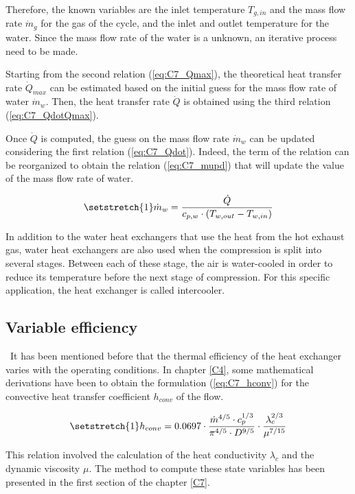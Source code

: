 Therefore, the known variables are the inlet temperature $T_{g,in}$ and the mass flow rate $\dot{m}_g$ for the gas of the cycle, and the inlet and outlet temperature for the water. Since the mass flow rate of the water is a unknown, an iterative process need to be made. 

Starting from the second relation (\ref{eq:C7_Qmax}), the theoretical heat transfer rate $\dot{Q}_{max}$ can be estimated based on the initial guess for the mass flow rate of water $\dot{m}_w$. Then, the heat transfer rate $\dot{Q}$ is obtained using the third relation (\ref{eq:C7_QdotQmax}). 

Once $\dot{Q}$ is computed, the guess on the mass flow rate $\dot{m}_w$ can be updated considering the first relation (\ref{eq:C7_Qdot}). Indeed, the term of the relation can be reorganized to obtain the relation (\ref{eq:C7_mupd}) that will update the value of the mass flow rate of water.

\begin{equation}
    \setstretch{1}
    \dot{m}_w = \frac{\dot{Q}}{c_{p,w}\cdot \left(T_{w,out} - T_{w,in}\right)} \label{eq:C7_mupd}
\end{equation}

In addition to the water heat exchangers that use the heat from the hot exhaust gas, water heat exchangers are also used when the compression is split into several stages. Between each of these stage, the air is water-cooled in order to reduce its temperature before the next stage of compression. For this specific application, the heat exchanger is called intercooler.

\subsection{Variable efficiency}
\quad\ It has been mentioned before that the thermal efficiency of the heat exchanger varies with the operating conditions. In chapter \ref{C4}, some mathematical derivations have been to obtain the formulation (\ref{eq:C7_hconv}) for the convective heat transfer coefficient $h_{conv}$ of the flow. 

\begin{equation}
    \setstretch{1}
    h_{conv} = 0.0697\cdot \frac{\dot{m}^{4/5}\cdot c_p^{1/3}}{\pi^{4/5}\cdot D^{9/5}}\cdot \frac{\lambda_c^{2/3}}{\mu^{7/15}}\label{eq:C7_hconv}
\end{equation}

This relation involved the calculation of the heat conductivity $\lambda_c$ and the dynamic viscosity $\mu$. The method to compute these state variables has been presented in the first section of the chapter \ref{C7}.

